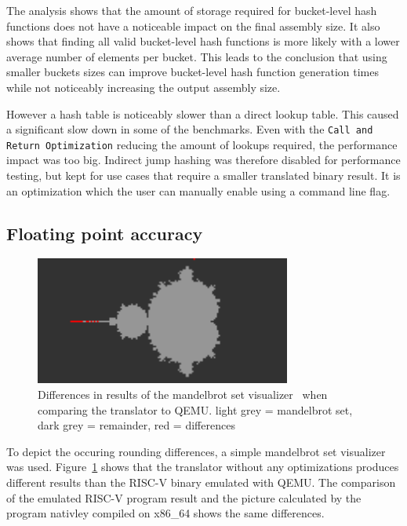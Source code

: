 \documentclass[course=eragp]{aspdoc}
\begin{document}
\par

The analysis shows that
the amount of storage required for bucket-level hash functions does not have a noticeable impact on
the final assembly size. It also shows that finding all valid bucket-level hash functions is more
likely with a lower average number of elements per bucket. This leads to the conclusion that using
smaller buckets sizes can improve bucket-level hash function generation times while not noticeably
increasing the output assembly size.

\par

However a hash table is noticeably slower than a direct lookup table. This caused a significant slow down
in some of the benchmarks.
Even with the \texttt{Call and Return Optimization} reducing the amount of lookups required, the performance
impact was too big.
Indirect jump hashing was therefore disabled for performance testing, but kept for use cases that require a smaller translated
binary result. It is an optimization which the user can manually enable using a command line flag.

\subsection{Floating point accuracy}

\begin{figure}[H]
    \centering
    \includegraphics[width=0.75\textwidth]{images/mandelbrot_differences/translated_diff.png}
    \caption{Differences in results of the mandelbrot set visualizer~\cite{mandelbrot_program} when
        comparing the translator to QEMU. light grey = mandelbrot set, dark grey = remainder, red =
        differences}\label{fig:mandelbrot_diff_translator}
\end{figure}

To depict the occuring rounding differences, a simple mandelbrot set
visualizer~\cite{mandelbrot_program} was used. Figure~\ref{fig:mandelbrot_diff_translator} shows
that the translator without any optimizations produces different results than the RISC-V binary
emulated with QEMU. The comparison of the emulated RISC-V program result and the picture calculated
by the program nativley compiled on x86\_64 shows the same differences.
\end{document}
